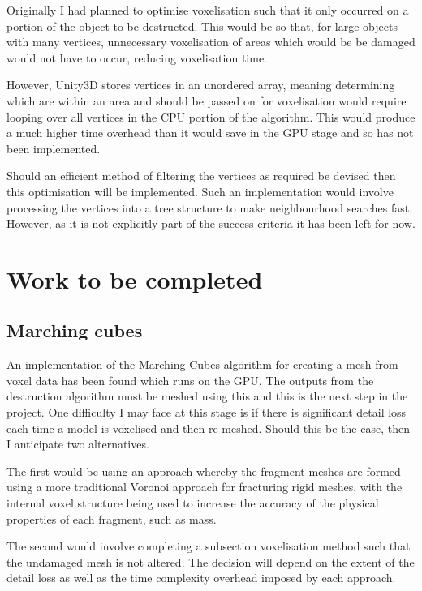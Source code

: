 \documentclass[a4 paper,12pt]{article}
\begin{document}
Originally I had planned to optimise voxelisation such that it only occurred on a portion of the object to be destructed. This would be so that, for large objects with many vertices, unnecessary voxelisation of areas which would be be damaged would not have to occur, reducing voxelisation time.

However, Unity3D stores vertices in an unordered array, meaning determining which are within an area and should be passed on for voxelisation would require looping over all vertices in the CPU portion of the algorithm. This would produce a much higher time overhead than it would save in the GPU stage and so has not been implemented.

Should an efficient method of filtering the vertices as required be devised then this optimisation will be implemented. Such an implementation would involve processing the vertices into a tree structure to make neighbourhood searches fast. However, as it is not explicitly part of the success criteria it has been left for now.

\section{Work to be completed}

\subsection*{Marching cubes}

An implementation of the Marching Cubes algorithm for creating a mesh from voxel data has been found which runs on the GPU. The outputs from the destruction algorithm must be meshed using this and this is the next step in the project. One difficulty I may face at this stage is if there is significant detail loss each time a model is voxelised and then re-meshed. Should this be the case, then I anticipate two alternatives. 

The first would be using an approach whereby the fragment meshes are formed using a more traditional Voronoi approach for fracturing rigid meshes, with the internal voxel structure being used to increase the accuracy of the physical properties of each fragment, such as mass. 

The second would involve completing a subsection voxelisation method such that the undamaged mesh is not altered. The decision will depend on the extent of the detail loss as well as the time complexity overhead imposed by each approach.
\end{document}
